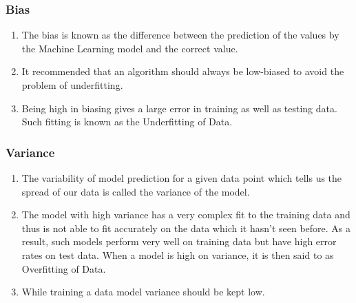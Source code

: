 \subsubsection{Bias}

\begin{enumerate}
    \item The bias is known as the difference between the prediction of the values by the Machine Learning model and the correct value.
    \hfill \cite{geeksforgeeks/machine-learning/ml-bias-variance-trade-off}

    \item It recommended that an algorithm should always be low-biased to avoid the problem of underfitting.
    \hfill \cite{geeksforgeeks/machine-learning/ml-bias-variance-trade-off}

    \item Being high in biasing gives a large error in training as well as testing data.
    Such fitting is known as the Underfitting of Data.
    \hfill \cite{geeksforgeeks/machine-learning/ml-bias-variance-trade-off}
\end{enumerate}




\subsubsection{Variance}

\begin{enumerate}
    \item The variability of model prediction for a given data point which tells us the spread of our data is called the variance of the model.
    \hfill \cite{geeksforgeeks/machine-learning/ml-bias-variance-trade-off}

    \item The model with high variance has a very complex fit to the training data and thus is not able to fit accurately on the data which it hasn’t seen before. As a result, such models perform very well on training data but have high error rates on test data. When a model is high on variance, it is then said to as Overfitting of Data.
    \hfill \cite{geeksforgeeks/machine-learning/ml-bias-variance-trade-off}

    \item While training a data model variance should be kept low.
    \hfill \cite{geeksforgeeks/machine-learning/ml-bias-variance-trade-off}
\end{enumerate}

























